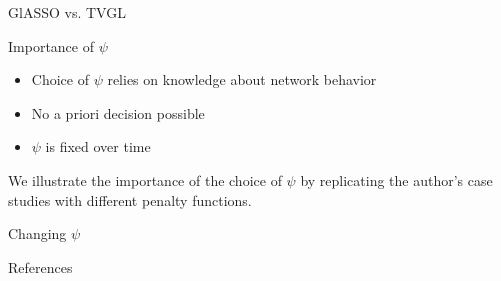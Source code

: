 \documentclass{beamer}
\begin{document}

\begin{frame}{GlASSO vs. TVGL}


\end{frame}


\begin{frame}{Importance of $\psi$}
    \begin{itemize}
        \item Choice of $\psi$ relies on knowledge about network behavior
        \item No a priori decision possible
        \item $\psi$ is fixed over time
    \end{itemize}
    We illustrate the importance of the choice of $\psi$ by replicating the author's case studies with different
    penalty functions.
\end{frame}

\begin{frame}{Changing $\psi$}

\end{frame}

\begin{frame}{References}
    \nocite{*}
    
    
\end{frame}
\end{document}
